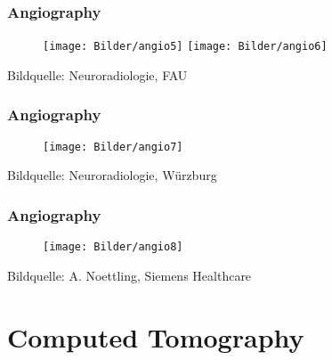 
\begin{frame}
	\frametitle{Angiography}
	\begin{figure}
		\texttt{[image: Bilder/angio5]}
		\hspace*{.25cm}
		\texttt{[image: Bilder/angio6]}
	\end{figure}
	\hspace*{.4cm}  \tiny Bildquelle: Neuroradiologie, FAU
\end{frame}

\begin{frame}
	\frametitle{Angiography}
	\begin{figure}
		\texttt{[image: Bilder/angio7]}
	\end{figure}
	\hspace*{.4cm}  \tiny Bildquelle: Neuroradiologie, Würzburg
\end{frame}

\begin{frame}
	\frametitle{Angiography}
	\begin{figure}
		\texttt{[image: Bilder/angio8]}
	\end{figure}
	\hspace*{.4cm}  \tiny Bildquelle: A. Noettling, Siemens Healthcare
\end{frame}





\section{Computed Tomography}


